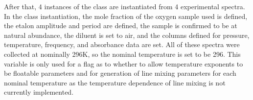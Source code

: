 \documentclass[letterpaper,10pt,english]{sphinxmanual}
\begin{document}
\sphinxAtStartPar
After that, 4 instances of the {\hyperref[\detokenize{MATS:MATS.spectrum.Spectrum}]{}} class are instantiated from 4 experimental spectra.  In the class instantiation, the mole fraction of the oxygen sample used is defined, the etalon amplitude and period are defined, the sample is confirmed to be at natural abundance, the diluent is set to air, and the columns defined for pressure, temperature, frequency, and absorbance data are set.  All of these spectra were collected at nominally 296K, so the nominal temperature is set to be 296.  This variable is only used for a flag as to whether to allow temperature exponents to be floatable parameters and for generation of line mixing parameters for each nominal temperature as the temperature dependence of line mixing is not currently implemented.
\end{document}
